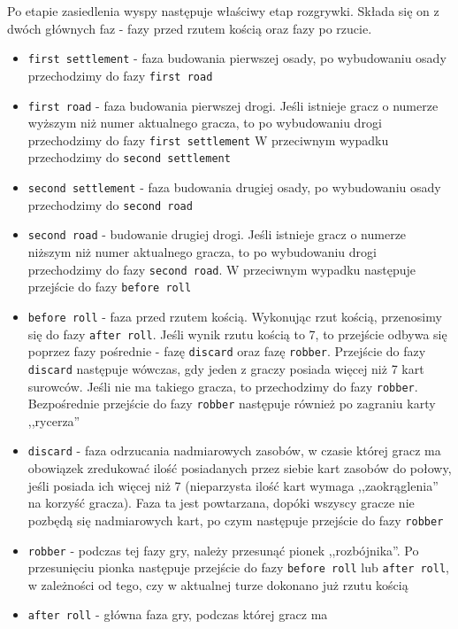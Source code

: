 \documentclass[a4paper,12pt]{article}
\begin{document}
Po etapie zasiedlenia wyspy następuje właściwy etap rozgrywki. Składa
się on z dwóch głównych faz - fazy przed rzutem kością oraz fazy po
rzucie.

\begin{itemize}
\item \texttt{first settlement} - faza budowania pierwszej osady, po
  wybudowaniu osady przechodzimy do fazy \texttt{first road}
\item \texttt{first road} - faza budowania pierwszej drogi. Jeśli
  istnieje gracz o numerze wyższym niż numer aktualnego gracza, to po
  wybudowaniu drogi przechodzimy do fazy \texttt{first settlement} W
  przeciwnym wypadku przechodzimy do \texttt{second settlement}
\item \texttt{second settlement} - faza budowania drugiej osady, po
  wybudowaniu osady przechodzimy do \texttt{second road}
\item \texttt{second road} - budowanie drugiej drogi. Jeśli istnieje
  gracz o numerze niższym niż numer aktualnego gracza, to po
  wybudowaniu drogi przechodzimy do fazy \texttt{second road}. W
  przeciwnym wypadku następuje przejście do fazy \texttt{before roll}
\item \texttt{before roll} - faza przed rzutem kością. Wykonując rzut
  kością, przenosimy się do fazy \texttt{after roll}. Jeśli wynik rzutu
  kością to 7, to przejście odbywa się poprzez fazy pośrednie - fazę
  \texttt{discard} oraz fazę \texttt{robber}. Przejście do fazy
  \texttt{discard} następuje wówczas, gdy jeden z graczy posiada więcej
  niż 7 kart surowców. Jeśli nie ma takiego gracza, to przechodzimy do
  fazy \texttt{robber}. Bezpośrednie przejście do fazy \texttt{robber}
  następuje również po zagraniu karty ,,rycerza''
\item \texttt{discard} - faza odrzucania nadmiarowych zasobów, w
  czasie której gracz ma obowiązek zredukować ilość posiadanych przez
  siebie kart zasobów do połowy, jeśli posiada ich więcej niż 7
  (nieparzysta ilość kart wymaga ,,zaokrąglenia'' na korzyść
  gracza). Faza ta jest powtarzana, dopóki wszyscy gracze nie pozbędą
  się nadmiarowych kart, po czym następuje przejście do fazy
  \texttt{robber}
\item \texttt{robber} - podczas tej fazy gry, należy przesunąć pionek
  ,,rozbójnika''. Po przesunięciu pionka następuje przejście do fazy
  \texttt{before roll} lub \texttt{after roll}, w zależności od tego,
  czy w aktualnej turze dokonano już rzutu kością
\item \texttt{after roll} - główna faza gry, podczas której gracz ma

\end{itemize}
\end{document}
